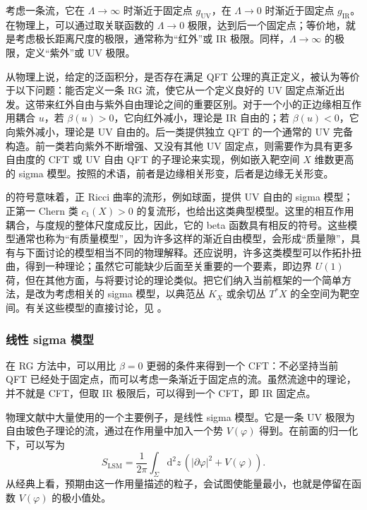 考虑一条流，它在 $\Lambda\to\infty$ 时渐近于固定点 $g_{\mathrm{UV}}$，在 $\Lambda\to0$ 时渐近于固定点 $g_{\mathrm{IR}}$。在物理上，可以通过取关联函数的 $\Lambda\to0$ 极限，达到后一个固定点；等价地，就是考虑极长距离尺度的极限，通常称为“红外”或 IR 极限。同样，$\Lambda\to\infty$ 的极限，定义“紫外”或 UV 极限。

从物理上说，给定的泛函积分，是否存在满足 QFT 公理的真正定义，被认为等价于以下问题：能否定义一条 RG 流，使它从一个定义良好的 UV 固定点渐近出发。这带来红外自由与紫外自由理论之间的重要区别。对于一个小的正边缘相互作用耦合 $u$，若 $\beta(u)>0$，它向红外减小，理论是 IR 自由的；若 $\beta(u)<0$，它向紫外减小，理论是 UV 自由的。后一类提供独立 QFT 的一个通常的 UV 完备构造。前一类若向紫外不断增强、又没有其他 UV 固定点，则需要作为具有更多自由度的 CFT 或 UV 自由 QFT 的子理论来实现，例如嵌入靶空间 $X$ 维数更高的 sigma 模型。按照的术语，前者是边缘相关形变，后者是边缘无关形变。

的符号意味着，正 Ricci 曲率的流形，例如球面，提供 UV 自由的 sigma 模型；正第一 Chern 类 $c_1(X)>0$ 的复流形，也给出这类典型模型。这里的相互作用耦合，与度规的整体尺度成反比，因此，它的 beta 函数具有相反的符号。这些模型通常也称为“有质量模型”，因为许多这样的渐近自由模型，会形成“质量隙”，具有与下面讨论的模型相当不同的物理解释。还应说明，许多这类模型可以作拓扑扭曲，得到一种理论；虽然它可能缺少后面至关重要的一个要素，即边界 $U(1)$ 荷，但在其他方面，与将要讨论的理论类似。把它们纳入当前框架的一个简单方法，是改为考虑相关的 sigma 模型，以典范丛 $K_X$ 或余切丛 $T^*X$ 的全空间为靶空间。有关这些模型的直接讨论，见 。

\subsubsection{线性 sigma 模型}\label{sec:3.2.6.3}

在 RG 方法中，可以用比 $\beta=0$ 更弱的条件来得到一个 CFT：不必坚持当前 QFT 已经处于固定点，而可以考虑一条渐近于固定点的流。虽然流途中的理论，并不就是 CFT，但取 IR 极限后，可以得到一个 CFT，即 IR 固定点。

物理文献中大量使用的一个主要例子，是线性 sigma 模型。它是一条 UV 极限为自由玻色子理论的流，通过在作用量中加入一个势 $V(\varphi)$ 得到。在前面的归一化下，可以写为
\[
S_{\mathrm{LSM}}=\frac1{2\pi}\int_\Sigma\mathrm{d}^2z\,
\left(|\partial\varphi|^2+V(\varphi)\right).
\]
从经典上看，预期由这一作用量描述的粒子，会试图使能量最小，也就是停留在函数 $V(\varphi)$ 的极小值处。

